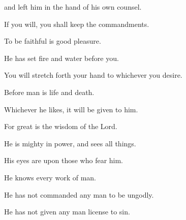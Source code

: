 {\par }{\QB and left him in the hand of his own counsel.
\par }{\Q {}If you will, you shall keep the commandments.
\par }{\QB To be faithful is good pleasure.
\par }{\Q {}He has set fire and water before you.
\par }{\QB You will stretch forth your hand to whichever you desire.
\par }{\Q {}Before man is life and death.
\par }{\QB Whichever he likes, it will be given to him.
\par }{\Q {}For great is the wisdom of the Lord.
\par }{\QB He is mighty in power, and sees all things.
\par }{\Q {}His eyes are upon those who fear him.
\par }{\QB He knows every work of man.
\par }{\Q {}He has not commanded any man to be ungodly.
\par }{\QB He has not given any man license to sin.
\par }{\BB \par }
